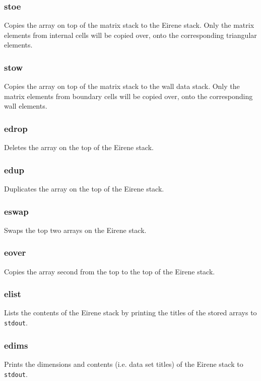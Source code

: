 \documentclass[a4paper,10pt]{report}
\begin{document}
\subsubsection{stoe}\label{sec:stoe}
Copies the array on top of the matrix stack to the Eirene stack. Only the matrix
elements from internal cells will be copied over, onto the corresponding triangular elements.

\subsubsection{stow}\label{sec:stow}
Copies the array on top of the matrix stack to the wall data stack. Only the matrix
elements from boundary cells will be copied over, onto the corresponding wall elements.

\subsubsection{edrop}\label{sec:edrop}
Deletes the array on the top of the Eirene stack.

\subsubsection{edup}\label{sec:edup}
Duplicates the array on the top of the Eirene stack.

\subsubsection{eswap}\label{sec:eswap}
Swaps the top two arrays on the Eirene stack.

\subsubsection{eover}\label{sec:eover}
Copies the array second from the top to the top of the Eirene stack.

\subsubsection{elist}\label{sec:elist}
Lists the contents of the Eirene stack by printing the titles
of the stored arrays to {\tt stdout}.

\subsubsection{edims}\label{sec:edims}
Prints the dimensions and contents (i.e. data set titles) of the Eirene
stack to {\tt stdout}.
\end{document}
